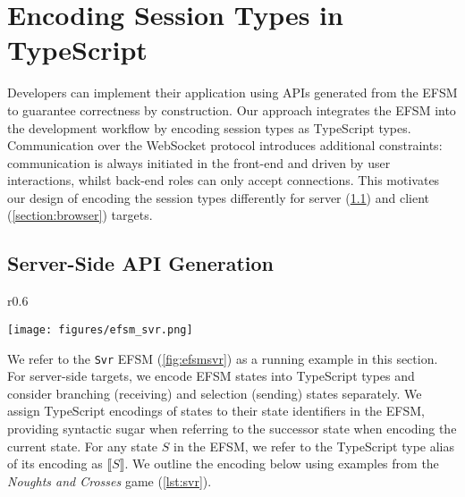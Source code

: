 \section{Encoding Session Types in TypeScript}

Developers can implement their application using APIs generated from the EFSM
to guarantee correctness by construction.
Our approach integrates the EFSM into the development workflow by encoding
session types as TypeScript types.
Communication over the WebSocket protocol introduces additional constraints:
communication is always initiated in the front-end and driven by user interactions,
whilst back-end roles can only accept connections.
This motivates our design of encoding the session types differently for server
(\cref{section:server}) and client (\cref{section:browser}) targets.

\subsection{Server-Side API Generation}
\label{section:server}


\begin{wrapfigure}{r}{0.6\textwidth}
  \vspace{-5mm}
  \begin{center}
    \texttt{[image: figures/efsm\_svr.png]}
  \end{center}

  \vspace{-5mm}
  \label{fig:efsmsvr}
\vspace{-1cm}
\end{wrapfigure}

We refer to the \texttt{Svr} EFSM (\cref{fig:efsmsvr}) as a running example in
this section.
For server-side targets, we encode EFSM states into TypeScript types and
consider branching (receiving) and selection (sending) states separately.
We assign TypeScript encodings of states to their state identifiers in the
EFSM, providing syntactic sugar when referring to the successor state when
encoding the current state.
For any state $S$ in the EFSM, we refer to the TypeScript type alias of its
encoding as $\llbracket S \rrbracket$.
We outline the encoding below using examples from the
\textit{Noughts and Crosses} game (\cref{lst:svr}).

